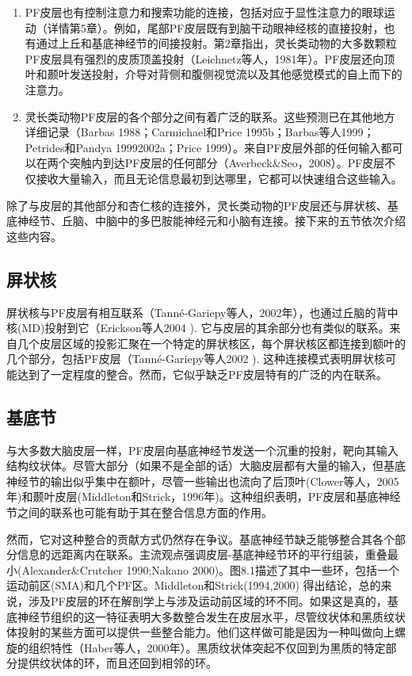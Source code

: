 \begin{enumerate}
\item PF皮层也有控制注意力和搜索功能的连接，包括对应于显性注意力的眼球运动（详情第5章）。例如，尾部PF皮层既有到脑干动眼神经核的直接投射，也有通过上丘和基底神经节的间接投射。第2章指出，灵长类动物的大多数颗粒PF皮层具有强烈的皮质顶盖投射（Leichnetz等人，1981年）。PF皮层还向顶叶和颞叶发送投射，介导对背侧和腹侧视觉流以及其他感觉模式的自上而下的注意力。

\item 灵长类动物PF皮层的各个部分之间有着广泛的联系。这些预测已在其他地方详细记录（Barbas 1988；Carmichael和Price 1995b；Barbas等人1999；Petrides和Pandya 19992002a；Price 1999）。来自PF皮层外部的任何输入都可以在两个突触内到达PF皮层的任何部分（Averbeck$\&$Seo，2008）。PF皮层不仅接收大量输入，而且无论信息最初到达哪里，它都可以快速组合这些输入。
\end{enumerate}
\par
除了与皮层的其他部分和杏仁核的连接外，灵长类动物的PF皮层还与屏状核、基底神经节、丘脑、中脑中的多巴胺能神经元和小脑有连接。接下来的五节依次介绍这些内容。

\subsection{屏状核}
\par
屏状核与PF皮层有相互联系（Tanné-Gariepy等人，2002年），也通过丘脑的背中核(MD)投射到它（Erickson等人2004 ). 它与皮层的其余部分也有类似的联系。来自几个皮层区域的投影汇聚在一个特定的屏状核区，每个屏状核区都连接到额叶的几个部分，包括PF皮层（Tanné-Gariepy等人2002 ). 这种连接模式表明屏状核可能达到了一定程度的整合。然而，它似乎缺乏PF皮层特有的广泛的内在联系。

\subsection{基底节}
\par
与大多数大脑皮层一样，PF皮层向基底神经节发送一个沉重的投射，靶向其输入结构纹状体。尽管大部分（如果不是全部的话）大脑皮层都有大量的输入，但基底神经节的输出似乎集中在额叶，尽管一些输出也流向了后顶叶(Clower等人，2005年)和颞叶皮层(Middleton和Strick，1996年)。这种组织表明，PF皮层和基底神经节之间的联系也可能有助于其在整合信息方面的作用。
\par
然而，它对这种整合的贡献方式仍然存在争议。基底神经节缺乏能够整合其各个部分信息的远距离内在联系。主流观点强调皮层-基底神经节环的平行组装，重叠最小(Alexander$\&$Crutcher 1990;Nakano 2000)。图8.1描述了其中一些环，包括一个运动前区(SMA)和几个PF区。Middleton和Strick(1994,2000) 得出结论，总的来说，涉及PF皮层的环在解剖学上与涉及运动前区域的环不同。如果这是真的，基底神经节组织的这一特征表明大多数整合发生在皮层水平，尽管纹状体和黑质纹状体投射的某些方面可以提供一些整合能力。他们这样做可能是因为一种叫做向上螺旋的组织特性（Haber等人，2000年）。黑质纹状体突起不仅回到为黑质的特定部分提供纹状体的环，而且还回到相邻的环。

